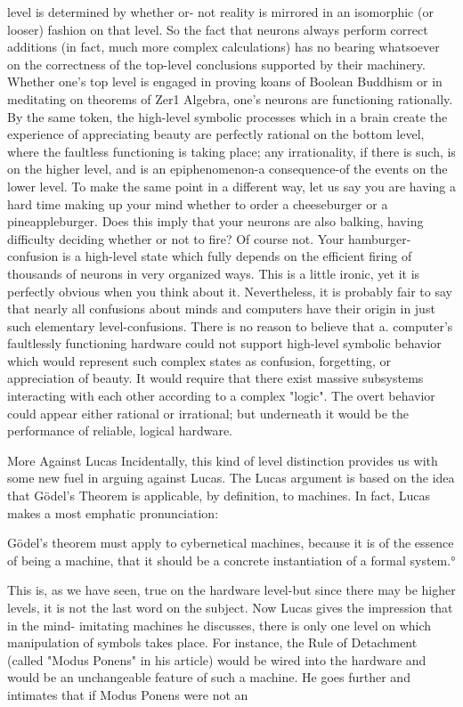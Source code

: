 {level is determined by whether or- not reality is mirrored in an isomorphic (or looser)
fashion on that level. So the fact that neurons always perform correct additions (in fact,
much more complex calculations) has no bearing whatsoever on the correctness of the
top-level conclusions supported by their machinery. Whether one's top level is engaged in
proving koans of Boolean Buddhism or in meditating on theorems of Zer1 Algebra, one's
neurons are functioning rationally. By the same token, the high-level symbolic processes
which in a brain create the experience of appreciating beauty are perfectly rational on the
bottom level, where the faultless functioning is taking place; any irrationality, if there is
such, is on the higher level, and is an epiphenomenon-a consequence-of the events on the
lower level.
        To make the same point in a different way, let us say you are having a hard time
making up your mind whether to order a cheeseburger or a pineappleburger. Does this
imply that your neurons are also balking, having difficulty deciding whether or not to
fire? Of course not. Your hamburger-confusion is a high-level state which fully depends
on the efficient firing of thousands of neurons in very organized ways. This is a little
ironic, yet it is perfectly obvious when you think about it. Nevertheless, it is probably fair
to say that nearly all confusions about minds and computers have their origin in just such
elementary level-confusions.
        There is no reason to believe that a. computer's faultlessly functioning hardware
could not support high-level symbolic behavior which would represent such complex
states as confusion, forgetting, or appreciation of beauty. It would require that there exist
massive subsystems interacting with each other according to a complex "logic". The
overt behavior could appear either rational or irrational; but underneath it would be the
performance of reliable, logical hardware.

                                 More Against Lucas
Incidentally, this kind of level distinction provides us with some new fuel in arguing
against Lucas. The Lucas argument is based on the idea that Gödel’s Theorem is
applicable, by definition, to machines. In fact, Lucas makes a most emphatic
pronunciation:

   Gödel’s theorem must apply to cybernetical machines, because it is of the essence
   of being a machine, that it should be a concrete instantiation of a formal system.°

This is, as we have seen, true on the hardware level-but since there may be higher levels,
it is not the last word on the subject. Now Lucas gives the impression that in the mind-
imitating machines he discusses, there is only one level on which manipulation of
symbols takes place. For instance, the Rule of Detachment (called "Modus Ponens" in his
article) would be wired into the hardware and would be an unchangeable feature of such
a machine. He goes further and intimates that if Modus Ponens were not an




}
